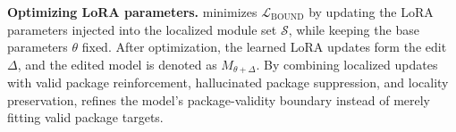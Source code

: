 \noindent{} \textbf{Optimizing LoRA parameters.}
\appname minimizes $\mathcal{L}_{\mathrm{BOUND}}$ by updating the LoRA parameters injected into the localized module set $\mathcal{S}$, while keeping the base parameters $\theta$ fixed. 
After optimization, the learned LoRA updates form the edit $\Delta$, and the edited model is denoted as $M_{\theta+\Delta}$. 
By combining localized updates with valid package reinforcement, hallucinated package suppression, and locality preservation, \appname refines the model's package-validity boundary instead of merely fitting valid package targets.